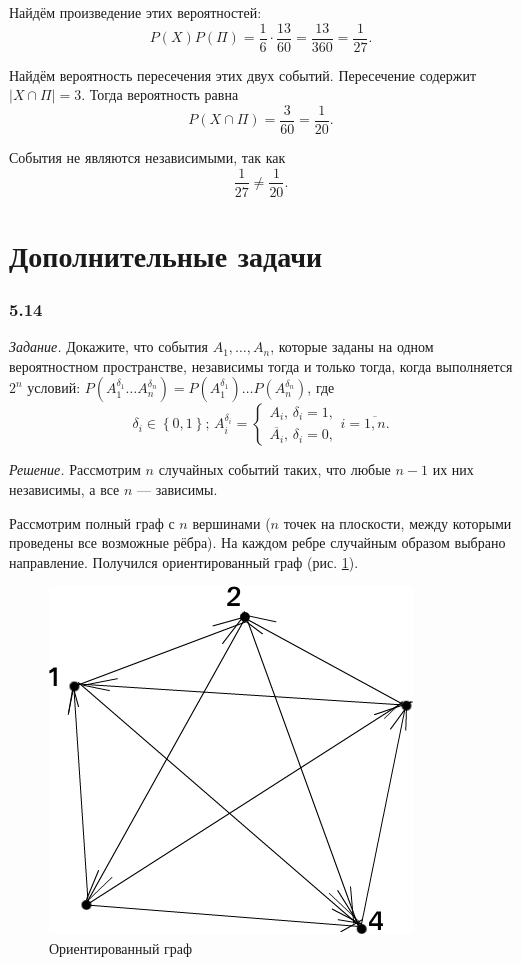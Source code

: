 Найдём произведение этих вероятностей:
$$P \left( X \right) P \left( \Pi \right) =
\frac{1}{6} \cdot \frac{13}{60} =
\frac{13}{360} =
\frac{1}{27}.$$

Найдём вероятность пересечения этих двух событий.
Пересечение содержит $ \left| X \cap \Pi \right| = 3$.
Тогда вероятность равна
$$P \left( X \cap \Pi \right) =
\frac{3}{60} =
\frac{1}{20}.$$

События не являются независимыми, так как
$$ \frac{1}{27} \neq \frac{1}{20}.$$

\section*{Дополнительные задачи}

\subsubsection*{5.14}

\textit{Задание.}
Докажите, что события
$A_1, \dotsc, A_n$,
которые заданы на одном вероятностном пространстве,
независимы тогда и только тогда,
когда выполняется $2^n$ условий:
$P \left( A_1^{ \delta_1} \dotsc A_n^{ \delta_n} \right) =
P \left( A_1^{ \delta_1} \right) \dotsc P \left( A_n^{ \delta_n} \right) $, где
$$ \delta_i \in \left\{ 0, 1 \right\}; \, A_i^{ \delta_i} =
\begin{cases}
A_i, \, \delta_i = 1, \\
\overline{A_i}, \, \delta_i = 0,
\end{cases}
i = \overline{1, n}.$$

\textit{Решение.} Рассмотрим $n$ случайных событий таких, что любые $n-1$ их них независимы, а все $n$ --- зависимы.

Рассмотрим полный граф с $n$ вершинами ($n$ точек на плоскости, между которыми проведены все возможные рёбра).
На каждом ребре случайным образом выбрано направление.
Получился ориентированный граф (рис. \ref{fig:514}).

\begin{figure}[h!]
  \centering
  \includegraphics[width=.4\textwidth]{./pictures/5_14.png}
  \caption{Ориентированный граф}
  \label{fig:514}
\end{figure}

